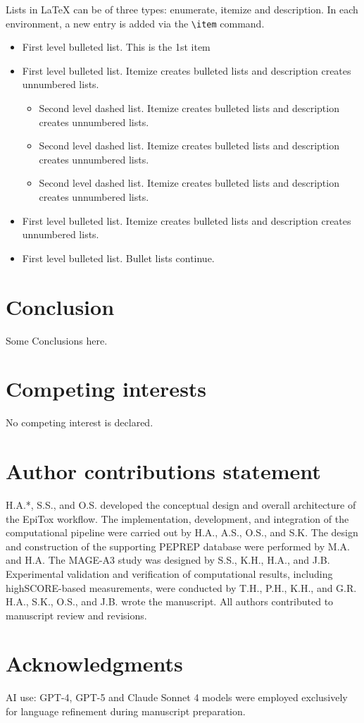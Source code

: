 \documentclass[unnumsec,webpdf,contemporary,large]{oup-authoring-template}%
\theoremstyle{thmstyleone}%
\theoremstyle{thmstyletwo}%
\theoremstyle{thmstylethree}%
\begin{document}
Lists in \LaTeX{} can be of three types: enumerate, itemize and description.
In each environment, a new entry is added via the \verb+\item+ command.
\begin{itemize}
\item First level bulleted list. This is the 1st item

\item First level bulleted list. Itemize creates bulleted lists and description creates unnumbered lists.
\begin{itemize}
\item Second level dashed list. Itemize creates bulleted lists and description creates unnumbered lists.

\item Second level dashed list. Itemize creates bulleted lists and description creates unnumbered lists.

\item Second level dashed list. Itemize creates bulleted lists and description creates unnumbered lists.
\end{itemize}

\item First level bulleted list. Itemize creates bulleted lists and description creates unnumbered lists.

\item First level bulleted list. Bullet lists continue.
\end{itemize}


\section{Conclusion}

Some Conclusions here.

\section{Competing interests}
No competing interest is declared.

\section{Author contributions statement}
    H.A.*, S.S., and O.S. developed the conceptual design and overall architecture of the EpiTox workflow. The implementation, development, and integration of the computational pipeline were carried out by H.A., A.S., O.S., and S.K. The design and construction of the supporting PEPREP database were performed by M.A. and H.A. The MAGE-A3 study was designed by S.S., K.H., H.A., and J.B. Experimental validation and verification of computational results, including highSCORE-based measurements, were conducted by T.H., P.H., K.H., and G.R. H.A., S.K., O.S., and J.B. wrote the manuscript. All authors contributed to manuscript review and revisions.

\section{Acknowledgments}
AI use: GPT-4, GPT-5 and Claude Sonnet 4 models were employed exclusively for language
refinement during manuscript preparation.



\end{document}
